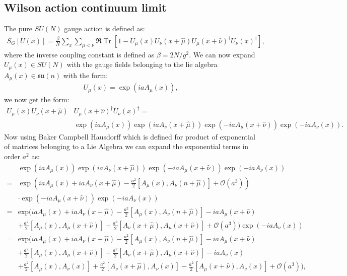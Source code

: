 \documentclass[english,twoside,openright]{UH_TCM_MSc}
\DeclareMathOperator{\Tr}{Tr}
\begin{document}
\begin{appendices}
\myappendixtitle

\chapter{Wilson action continuum limit\label{appendix:action_continuum}}
The pure $SU(N)$ gauge action is defined as:
\begin{align}
    S_G[U(x)] = \frac{\beta}{N}\sum_{x}\sum_{\mu <\nu}\Re\Tr[1-U_\mu(x)U_\nu(x+\hat{\mu})U_\mu(x+\hat\nu)^\dagger U_\nu(x)^\dagger],
\end{align}
where the inverse coupling constant is defined as $\beta = 2N/g^2$. We can now expand $U_\mu(x)\in SU(N)$ with the gauge fields belonging to the lie algebra $A_\mu(x) \in \mathfrak{su}(n)$ with the form:
\begin{align}
    U_\mu(x) = \exp(iaA_\mu(x)),
\end{align}
we now get the form:
\begin{align}
    U_\mu(x)U_\nu(x+\hat{\mu})&U_\mu(x+\hat\nu)^\dagger U_\nu(x)^\dagger = \\
    &\exp(iaA_\mu(x))\exp(iaA_\nu(x+\hat{\mu}))\exp(-iaA_\mu(x+\hat\nu))\exp(-iaA_\nu(x)).
\end{align}
Now using Baker Campbell Hausdorff \cite{Hall2003} which is defined for product of exponential of matrices belonging to a Lie Algebra we can expand the exponential terms in order $a^2$ as:
\begin{align}
    &\exp(iaA_\mu(x))\exp(iaA_\nu(x+\hat{\mu}))\exp(-iaA_\mu(x+\hat\nu))\exp(-iaA_\nu(x)) \\
    =&\exp(ia A_\mu(x) + iaA_\nu(x+\hat\mu)-\frac{a^2}{2}[A_\mu(x),A_\nu(n+\hat\mu)]+\mathcal{O}(a^3))\\
    &\cdot\exp(-iaA_\mu(x+\hat\nu))\exp(-iaA_\nu(x)) \\
    =&\text{exp} (ia A_\mu(x) + iaA_\nu(x+\hat\mu)-\frac{a^2}{2}[A_\mu(x),A_\nu(n+\hat\mu)]-iaA_\mu(x+\hat\nu)\\
    &+\frac{a^2}{2}[A_\mu(x),A_\mu(x+\hat\nu)]+\frac{a^2}{2}[A_\nu(x+\hat\mu),A_\mu(x+\hat\nu)]+\mathcal{O}(a^3))\exp(-iaA_\nu(x)) \\
    =&\text{exp} (ia A_\mu(x) + iaA_\nu(x+\hat\mu)-\frac{a^2}{2}[A_\mu(x),A_\nu(n+\hat\mu)]-iaA_\mu(x+\hat\nu)\\
    &+\frac{a^2}{2}[A_\mu(x),A_\mu(x+\hat\nu)]+\frac{a^2}{2}[A_\nu(x+\hat\mu),A_\mu(x+\hat\nu)]-iaA_\nu(x)\\
    &+\frac{a^2}{2}[A_\mu(x),A_\nu(x)]+\frac{a^2}{2}[A_\nu(x+\hat\mu),A_\nu(x)]-\frac{a^2}{2}[A_\mu(x+\hat\nu),A_\nu(x)]+\mathcal{O}(a^3)),

\end{align}
\end{appendices}
\end{document}
